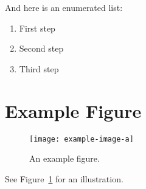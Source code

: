 \documentclass[UTF8]{ctexart}
\begin{document}
And here is an enumerated list:

\begin{enumerate}
    \item First step
    \item Second step
    \item Third step
\end{enumerate}

\section{Example Figure}
\begin{figure}[htbp]
    \centering
    \texttt{[image: example-image-a]} %
    \caption{An example figure.}
    \label{fig:example}
\end{figure}
See Figure~\ref{fig:example} for an illustration.
\end{document}

